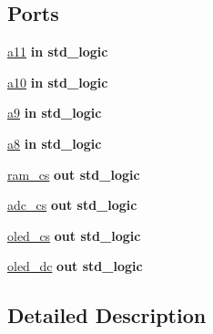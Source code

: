 \subsection*{Ports}
 \begin{DoxyCompactItemize}
\item 
\hyperlink{classaddress__decoder_a437e5699fd8034e3f753abeedaea13f1}{a11}  {\bfseries {\bfseries \textcolor{keywordflow}{in}\textcolor{vhdlchar}{ }}} {\bfseries \textcolor{comment}{std\+\_\+logic}\textcolor{vhdlchar}{ }} 
\item 
\hyperlink{classaddress__decoder_acd015df1a3bf79033001ea825f46afb0}{a10}  {\bfseries {\bfseries \textcolor{keywordflow}{in}\textcolor{vhdlchar}{ }}} {\bfseries \textcolor{comment}{std\+\_\+logic}\textcolor{vhdlchar}{ }} 
\item 
\hyperlink{classaddress__decoder_a479b78cc93591b44abbb3df1fcc41b1c}{a9}  {\bfseries {\bfseries \textcolor{keywordflow}{in}\textcolor{vhdlchar}{ }}} {\bfseries \textcolor{comment}{std\+\_\+logic}\textcolor{vhdlchar}{ }} 
\item 
\hyperlink{classaddress__decoder_ac954cc9f3cb642d4a50e8c9124bf3e0d}{a8}  {\bfseries {\bfseries \textcolor{keywordflow}{in}\textcolor{vhdlchar}{ }}} {\bfseries \textcolor{comment}{std\+\_\+logic}\textcolor{vhdlchar}{ }} 
\item 
\hyperlink{classaddress__decoder_a25ffe17e2a2d6a68046cebb718fec50d}{ram\+\_\+cs}  {\bfseries {\bfseries \textcolor{keywordflow}{out}\textcolor{vhdlchar}{ }}} {\bfseries \textcolor{comment}{std\+\_\+logic}\textcolor{vhdlchar}{ }} 
\item 
\hyperlink{classaddress__decoder_a1a7cd4949de62d9b22d7ac1b2a9efac8}{adc\+\_\+cs}  {\bfseries {\bfseries \textcolor{keywordflow}{out}\textcolor{vhdlchar}{ }}} {\bfseries \textcolor{comment}{std\+\_\+logic}\textcolor{vhdlchar}{ }} 
\item 
\hyperlink{classaddress__decoder_a8d973d4ad0aa63435f405096541c8968}{oled\+\_\+cs}  {\bfseries {\bfseries \textcolor{keywordflow}{out}\textcolor{vhdlchar}{ }}} {\bfseries \textcolor{comment}{std\+\_\+logic}\textcolor{vhdlchar}{ }} 
\item 
\hyperlink{classaddress__decoder_a0e038af843b8b3cdf7ddf1968d935a1a}{oled\+\_\+dc}  {\bfseries {\bfseries \textcolor{keywordflow}{out}\textcolor{vhdlchar}{ }}} {\bfseries \textcolor{comment}{std\+\_\+logic}\textcolor{vhdlchar}{ }} 
\end{DoxyCompactItemize}


\subsection{Detailed Description}


